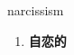 
\begin{frame}
{\huge narcissism}
\begin{center}
\begin{enumerate}\Large
  \item \textbf{自恋的}
\end{enumerate}
\end{center}
\end{frame}
